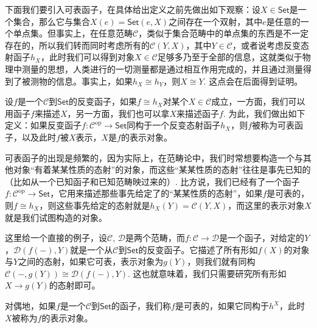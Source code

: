 

\para 下面我们要引入可表函子，在具体给出定义之前先做出如下观察：设$X\in\mathsf{Set}$是一个集合，那么它与集合$X(e)={\mathsf{Set}}(e,X)$之间存在一个双射，其中$e$是任意的一个单点集。但事实上，在任意范畴$\mathcal{C}$，类似于集合范畴中的单点集的东西是不一定存在的，所以我们转而同时考虑所有的${\mathcal{C}}(Y,X)$，其中$Y\in \mathcal{C}$，或者说考虑反变态射函子$h_X$，此时我们可以得到对象$X\in \mathcal{C}$足够多乃至于全部的信息，这就类似于物理中测量的思想，人类进行的一切测量都是通过相互作用完成的，并且通过测量得到了被测物的信息。事实上，如果$h_X\cong h_Y$，则$X\cong Y$. 这点会在后面得到证明。

设$f$是一个$\mathcal{C}$到$\mathsf{Set}$的反变函子，如果$f\cong h_X$对某个$X\in \mathcal{C}$成立，一方面，我们可以用函子$f$来描述$X$，另一方面，我们也可以拿$X$来描述函子$f$. 为此，我们做出如下定义：如果反变函子$f:\mathcal{C}^{\text{op}}\to \mathsf{Set}$同构于一个反变态射函子$h_X$，则$f$被称为可表函子，以及此时$f$被$X$表示，$X$是$f$的表示对象。

可表函子的出现是频繁的，因为实际上，在范畴论中，我们时常想要构造一个与其他对象“有着某某性质的态射”的对象，而这些“某某性质的态射”往往是事先已知的（比如从一个已知函子和已知范畴映过来的）. 比方说，我们已经有了一个函子$f:\mathcal{C}^\text{op}\to\mathsf{Set}$，它用来描述那些事先给定了的“某某性质的态射”，如果$f$是可表的，则$f\cong h_X$，则这些事先给定的态射就是$h_X(Y)=\mathcal{C}(Y,X)$，而这里的表示对象$X$就是我们试图构造的对象。

这里给一个直接的例子，设$\mathcal{C}$, $\mathcal{D}$是两个范畴，而$f:\mathcal{C}\to \mathcal{D}$是一个函子，对给定的$Y$，$\mathcal{D}(f(-),Y)$就是一个从$\mathcal{C}$到$\mathsf{Set}$的反变函子。它描述了所有形如$f(X)$的对象与$Y$之间的态射，如果它可表，表示对象为$g(Y)$，则我们就有同构$\mathcal{C}(-,g(Y))\cong \mathcal{D}(f(-),Y)$. 这也就意味着，我们只需要研究所有形如$X\to g(Y)$的态射即可。

对偶地，如果$f$是一个$\mathcal{C}$到$\mathsf{Set}$的函子，我们称$f$是可表的，如果它同构于$h^X$，此时$X$被称为$f$的表示对象。

